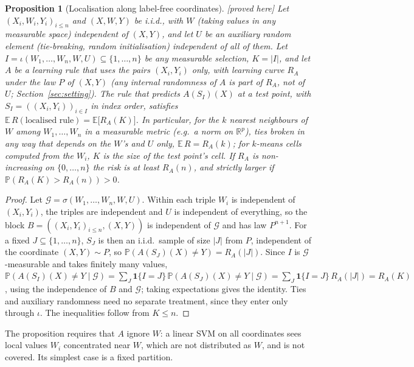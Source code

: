 \documentclass[11pt,a4paper]{article}
\theoremstyle{plain}
\newtheorem{proposition}[theorem]{Proposition}
\theoremstyle{definition}
\theoremstyle{remark}
\newcommand{\R}{\mathbb{R}}
\newcommand{\E}{\mathbb{E}}
\newcommand{\Prob}{\mathbb{P}}
\newcommand{\Risk}{R}
\newcommand{\status}[1]{\textsf{\small [#1]}}
\begin{document}
\begin{proposition}[Localisation along label-free coordinates]\label{prop:select}\status{proved here}
Let $(X_i,W_i,Y_i)_{i\le n}$ and $(X,W,Y)$ be i.i.d., with $W$ (taking values in any measurable space) independent of $(X,Y)$, and let $U$ be an auxiliary random element (tie-breaking, random initialisation) independent of all of them. Let $I=\iota(W_1,\dots,W_n,W,U)\subseteq\{1,\dots,n\}$ be any measurable selection, $K=|I|$, and let $A$ be a learning rule that uses the pairs $(X_i,Y_i)$ only, with learning curve $\Risk_A$ under the law $P$ of $(X,Y)$ (any internal randomness of $A$ is part of $\Risk_A$, not of $U$; Section~\ref{sec:setting}). The rule that predicts $A(S_I)(X)$ at a test point, with $S_I=((X_i,Y_i))_{i\in I}$ in index order, satisfies $\E\,\Risk(\text{localised rule})=\E\bigl[\Risk_A(K)\bigr]$.
In particular, for the $k$ nearest neighbours of $W$ among $W_1,\dots,W_n$ in a measurable metric (e.g.\ a norm on $\R^p$), ties broken in any way that depends on the $W$'s and $U$ only, $\E\,\Risk=\Risk_A(k)$; for $k$-means cells computed from the $W_i$, $K$ is the size of the test point's cell. If $\Risk_A$ is non-increasing on $\{0,\dots,n\}$ the risk is at least $\Risk_A(n)$, and strictly larger if $\Prob(\Risk_A(K)>\Risk_A(n))>0$.
\end{proposition}
\begin{proof}
Let $\mathcal G=\sigma(W_1,\dots,W_n,W,U)$. Within each triple $W_i$ is independent of $(X_i,Y_i)$, the triples are independent and $U$ is independent of everything, so the block $B=((X_i,Y_i)_{i\le n},(X,Y))$ is independent of $\mathcal G$ and has law $P^{n+1}$. For a fixed $J\subseteq\{1,\dots,n\}$, $S_J$ is then an i.i.d.\ sample of size $|J|$ from $P$, independent of the coordinate $(X,Y)\sim P$, so $\Prob(A(S_J)(X)\neq Y)=\Risk_A(|J|)$. Since $I$ is $\mathcal G$-measurable and takes finitely many values, $\Prob(A(S_I)(X)\neq Y\mid\mathcal G)=\sum_J\mathbf 1\{I=J\}\,\Prob(A(S_J)(X)\neq Y\mid\mathcal G)=\sum_J\mathbf 1\{I=J\}\,\Risk_A(|J|)=\Risk_A(K)$, using the independence of $B$ and $\mathcal G$; taking expectations gives the identity. Ties and auxiliary randomness need no separate treatment, since they enter only through $\iota$. The inequalities follow from $K\le n$.
\end{proof}

The proposition requires that $A$ ignore $W$: a linear SVM on all coordinates sees local values $W_i$ concentrated near $W$, which are not distributed as $W$, and is not covered. Its simplest case is a fixed partition.
\end{document}
